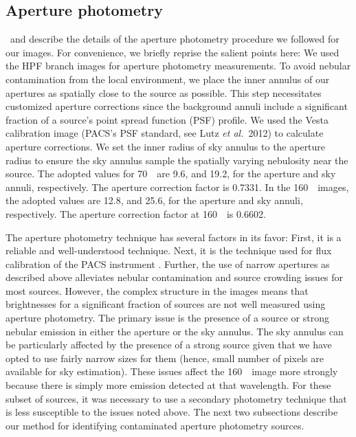 \documentclass[manuscript]{aastex61}
\newcommand{\etal}{{\em et al.}}
\begin{document}
\subsection{Aperture photometry}
\par
\cite{pbrpaper}\ and \cite{furlan} describe the details of the aperture photometry procedure we followed for our images.  For convenience, we briefly reprise the salient points here:  We used the HPF branch images for aperture photometry measurements.  To avoid nebular contamination from the local environment, we place the inner annulus of our apertures as spatially close to the source as possible.  This step necessitates customized aperture corrections since the background annuli include a significant fraction of a source's point spread function (PSF) profile.  We used the Vesta calibration image (PACS's PSF standard, see Lutz \etal\ 2012) to calculate aperture corrections.  We set the inner radius of sky annulus to the aperture radius to ensure the
sky annulus sample the spatially varying nebulosity near the source.  The adopted values for 70~\micron\ are 9.6\arcsec, and 19.2\arcsec, for the aperture and sky annuli, respectively. The aperture correction factor is 0.7331.  In the 160~\micron\ images, the adopted values are 12.8\arcsec, and 25.6\arcsec, for the aperture and sky annuli, respectively.  The aperture correction factor at 160~\micron\ is 0.6602.
\par
The aperture photometry technique has several factors in its favor: First, it is a reliable and well-understood technique.  Next, it is the technique used for flux calibration of the PACS instrument \citep{pacscal}.  Further, the use of narrow apertures as described above alleviates nebular contamination and source crowding issues for most sources.  However, the complex structure in the images means that brightnesses for a significant fraction of sources are not well measured using aperture photometry.  The primary issue is the presence of a source or strong nebular emission in either the aperture or the sky annulus.  The sky annulus can be particularly affected by the presence of a strong source given that we have opted to use fairly narrow sizes for them (hence, small number of pixels are available for sky estimation).   These issues affect the 160~\micron\ image more strongly because there is simply more emission detected at that wavelength.  For these subset of sources, it was necessary to use a secondary photometry technique that is less susceptible to the issues noted above.  The next two subsections describe our method for identifying contaminated aperture photometry sources.
\end{document}

